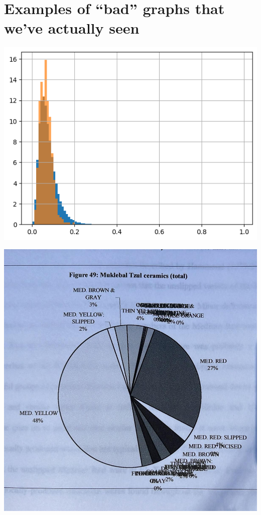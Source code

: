 \documentclass[aspectratio=169]{beamer}
\begin{document}
\section{Examples of ``bad'' graphs that we've actually seen}
\begin{frame}
    \centering
    \includegraphics[width=\textwidth,height=0.9\textheight,keepaspectratio]{output.png}
\end{frame}
\begin{frame}
    \centering
    \includegraphics[width=\textwidth,height=0.9\textheight,keepaspectratio]{published_archaeology_pie_chart.jpg}
\end{frame}
\end{document}
